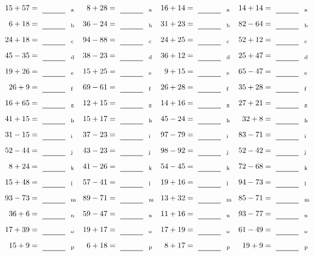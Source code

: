 \documentclass
[
  draft    = true,
  fontsize = 11pt,
  parskip  = half-
]
{scrartcl}
\begin{document}
\clearpage
\begin{align*}
    \pline{15+57}&=\rline{a}
  & \pline{8+28}&=\rline{a}
  & \pline{16+14}&=\rline{a}
  & \pline{14+14}&=\rline{a} \\[1ex]
    \pline{6+18}&=\rline{b}
  & \pline{36-24}&=\rline{b}
  & \pline{31+23}&=\rline{b}
  & \pline{82-64}&=\rline{b} \\[1ex]
    \pline{24+18}&=\rline{c}
  & \pline{94-88}&=\rline{c}
  & \pline{24+25}&=\rline{c}
  & \pline{52+12}&=\rline{c} \\[1ex]
    \pline{45-35}&=\rline{d}
  & \pline{38-23}&=\rline{d}
  & \pline{36+12}&=\rline{d}
  & \pline{25+47}&=\rline{d} \\[1ex]
    \pline{19+26}&=\rline{e}
  & \pline{15+25}&=\rline{e}
  & \pline{9+15}&=\rline{e}
  & \pline{65-47}&=\rline{e} \\[1ex]
    \pline{26+9}&=\rline{f}
  & \pline{69-61}&=\rline{f}
  & \pline{26+28}&=\rline{f}
  & \pline{35+28}&=\rline{f} \\[1ex]
    \pline{16+65}&=\rline{g}
  & \pline{12+15}&=\rline{g}
  & \pline{14+16}&=\rline{g}
  & \pline{27+21}&=\rline{g} \\[1ex]
    \pline{41+15}&=\rline{h}
  & \pline{15+17}&=\rline{h}
  & \pline{45-24}&=\rline{h}
  & \pline{32+8}&=\rline{h} \\[1ex]
    \pline{31-15}&=\rline{i}
  & \pline{37-23}&=\rline{i}
  & \pline{97-79}&=\rline{i}
  & \pline{83-71}&=\rline{i} \\[1ex]
    \pline{52-44}&=\rline{j}
  & \pline{43-23}&=\rline{j}
  & \pline{98-92}&=\rline{j}
  & \pline{52-42}&=\rline{j} \\[1ex]
    \pline{8+24}&=\rline{k}
  & \pline{41-26}&=\rline{k}
  & \pline{54-45}&=\rline{k}
  & \pline{72-68}&=\rline{k} \\[1ex]
    \pline{15+48}&=\rline{l}
  & \pline{57-41}&=\rline{l}
  & \pline{19+16}&=\rline{l}
  & \pline{94-73}&=\rline{l} \\[1ex]
    \pline{93-73}&=\rline{m}
  & \pline{89-71}&=\rline{m}
  & \pline{13+32}&=\rline{m}
  & \pline{85-71}&=\rline{m} \\[1ex]
    \pline{36+6}&=\rline{n}
  & \pline{59-47}&=\rline{n}
  & \pline{11+16}&=\rline{n}
  & \pline{93-77}&=\rline{n} \\[1ex]
    \pline{17+39}&=\rline{o}
  & \pline{19+17}&=\rline{o}
  & \pline{17+19}&=\rline{o}
  & \pline{61-49}&=\rline{o} \\[1ex]
    \pline{15+9}&=\rline{p}
  & \pline{6+18}&=\rline{p}
  & \pline{8+17}&=\rline{p}
  & \pline{19+9}&=\rline{p}
\end{align*}
\end{document}
